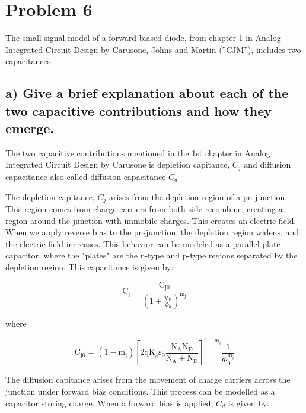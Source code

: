 \section{Problem 6}

The small-signal model of a forward-biased diode, from chapter 1 in Analog Integrated Circuit Design by Carusone, Johns and Martin (”CJM”), includes two capacitances.

\subsection*{a) Give a brief explanation about each of the two capacitive contributions and how
they emerge.}

The two capacitive contributions mentioned in the 1st chapter in Analog Integrated Circuit Design by Carusone is depletion capitance, $C_j$ and  diffusion capacitance also called diffusion capacitance $C_d$

The depletion capitance, $C_j$ arises from the depletion region of a pn-junction. This region comes from charge carriers from both side recombine, creating a region around the junction with immobile charges. This creates an electric field. When we apply reverse bias to the pn-junction, the depletion region widens, and the electric field increases. This behavior can be modeled as a parallel-plate capacitor, where the "plates" are the n-type and p-type regions separated by the depletion region.  This capacitance is given by:

\begin{equation*}
    \mathrm{C}_{\mathrm{j}}=\frac{\mathrm{C}_{\mathrm{j} 0}}{\left(1+\frac{\mathrm{V}_{\mathrm{B}}}{\Phi_{0}}\right)^{\mathrm{m}_{\mathrm{j}}}}
\end{equation*}

where

\begin{equation*}
    \mathrm{C}_{\mathrm{j} 0}=\left(1-\mathrm{m}_{\mathrm{j}}\right)\left[2 \mathrm{qK}_{\mathrm{s}} \varepsilon_{0} \frac{\mathrm{N}_{\mathrm{A}} \mathrm{N}_{\mathrm{D}}}{\mathrm{N}_{\mathrm{A}}+\mathrm{N}_{\mathrm{D}}}\right]^{1-\mathrm{m}_{\mathrm{j}}} \frac{1}{\Phi_{0}^{\mathrm{m}_{\mathrm{j}}}} 
\end{equation*}


The diffusion capitance arises from the movement of charge carriers across the junction under forward bias conditions. This process can be modelled as a capacitor storing charge. When a forward bias is applied,  $C_d$ is given by:

